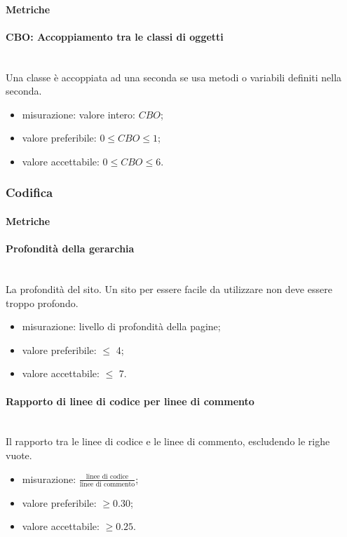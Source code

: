 		\paragraph{Metriche}
			\paragraph*{CBO: Accoppiamento tra le classi di oggetti} \mbox{}\\
			Una classe è accoppiata ad una seconda se usa metodi o variabili definiti nella seconda. 
			\begin{itemize}
				\item misurazione: valore intero: $CBO$;
				\item valore preferibile: $0 \leq CBO \leq 1$;
				\item valore accettabile: $0 \leq CBO \leq 6$.
			\end{itemize}
		
	\subsubsection{Codifica}
		\paragraph{Metriche}
			\paragraph*{Profondità della gerarchia} \mbox{}\\
			La profondità del sito. Un sito per essere facile da utilizzare non deve essere troppo profondo.
			\begin{itemize}
				\item misurazione: livello di profondità della pagine;
				\item valore preferibile: $\leq$ 4;
				\item valore accettabile: $\leq$ 7.
			\end{itemize}
		
			\paragraph*{Rapporto di linee di codice per linee di commento}
			 \mbox{}\\
			Il rapporto tra le linee di codice
			e le linee di commento, escludendo le righe vuote.
			\begin{itemize}
				\item misurazione: $\frac{\mbox{linee di codice}}{\mbox{linee di commento}}$;
				\item valore preferibile: $\geq 0.30$;
				\item valore accettabile: $\geq 0.25$.
			\end{itemize}
		
